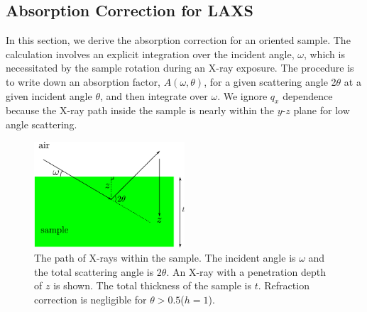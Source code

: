 \subsection{Absorption Correction for LAXS}\label{sec:absorption_correction}
In this section, we derive the absorption correction for an oriented sample. 
The calculation involves an explicit integration over the incident angle, 
$\omega$, which is necessitated by the sample rotation during an X-ray exposure. 
The procedure is to write down an absorption factor, $A(\omega,\theta)$, for a 
given scattering angle 2$\theta$ at a given incident angle $\theta$, and
then integrate over $\omega$. We ignore $q_x$ dependence because the X-ray
path inside the sample is nearly within the $y$-$z$ plane for low angle
scattering. 

\begin{figure}[htbp]
  \centering
  \includegraphics[width=0.5\textwidth]{figures/ripple/analysis/absorption_LAXS}
  \caption{The path of X-rays within the sample. The incident angle is 
  $\omega$ and the total scattering angle is $2\theta$. An X-ray with a
  penetration depth of $z$ is shown. The total thickness of the sample
  is $t$. Refraction correction is negligible for 
  $\theta > 0.5$\textdegree ($h=1$).}
  \label{fig:absorption_LAXS}
\end{figure}


